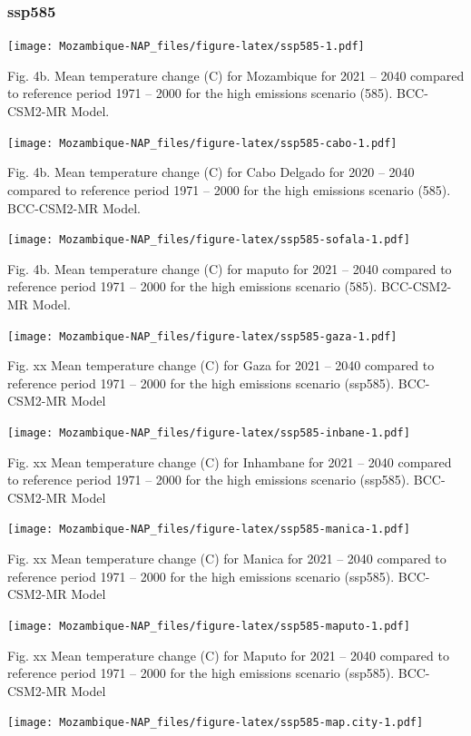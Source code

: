 \documentclass[
]{book}
\begin{document}
\hypertarget{ssp585}{%
\subsubsection{ssp585}\label{ssp585}}

\texttt{[image: Mozambique-NAP\_files/figure-latex/ssp585-1.pdf]}

Fig. 4b. Mean temperature change (C) for Mozambique for 2021 -- 2040 compared to reference period 1971 -- 2000 for the high emissions scenario (585). BCC-CSM2-MR Model.

\texttt{[image: Mozambique-NAP\_files/figure-latex/ssp585-cabo-1.pdf]}

Fig. 4b. Mean temperature change (C) for Cabo Delgado for 2020 -- 2040 compared to reference period 1971 -- 2000 for the high emissions scenario (585). BCC-CSM2-MR Model.

\texttt{[image: Mozambique-NAP\_files/figure-latex/ssp585-sofala-1.pdf]}

Fig. 4b. Mean temperature change (C) for maputo for 2021 -- 2040 compared to reference period 1971 -- 2000 for the high emissions scenario (585). BCC-CSM2-MR Model.

\texttt{[image: Mozambique-NAP\_files/figure-latex/ssp585-gaza-1.pdf]}

Fig. xx Mean temperature change (C) for Gaza for 2021 -- 2040 compared to reference period 1971 -- 2000 for the high emissions scenario (ssp585). BCC-CSM2-MR Model

\texttt{[image: Mozambique-NAP\_files/figure-latex/ssp585-inbane-1.pdf]}

Fig. xx Mean temperature change (C) for Inhambane for 2021 -- 2040 compared to reference period 1971 -- 2000 for the high emissions scenario (ssp585). BCC-CSM2-MR Model

\texttt{[image: Mozambique-NAP\_files/figure-latex/ssp585-manica-1.pdf]}

Fig. xx Mean temperature change (C) for Manica for 2021 -- 2040 compared to reference period 1971 -- 2000 for the high emissions scenario (ssp585). BCC-CSM2-MR Model

\texttt{[image: Mozambique-NAP\_files/figure-latex/ssp585-maputo-1.pdf]}

Fig. xx Mean temperature change (C) for Maputo for 2021 -- 2040 compared to reference period 1971 -- 2000 for the high emissions scenario (ssp585). BCC-CSM2-MR Model

\texttt{[image: Mozambique-NAP\_files/figure-latex/ssp585-map.city-1.pdf]}
\end{document}
